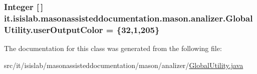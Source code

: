 \hypertarget{classit_1_1isislab_1_1masonassisteddocumentation_1_1mason_1_1analizer_1_1_global_utility_a0fcb324ae33eb93bd5b9177e342ecc82}{
\subsubsection[{user\-Output\-Color}]{\setlength{\rightskip}{0pt plus 5cm}Integer \mbox{[}$\,$\mbox{]} it.\-isislab.\-masonassisteddocumentation.\-mason.\-analizer.\-Global\-Utility.\-user\-Output\-Color = \{32,1,205\}\hspace{0.3cm}{\ttfamily [static]}}}\label{classit_1_1isislab_1_1masonassisteddocumentation_1_1mason_1_1analizer_1_1_global_utility_a0fcb324ae33eb93bd5b9177e342ecc82}


The documentation for this class was generated from the following file\-:\begin{DoxyCompactItemize}
\item 
src/it/isislab/masonassisteddocumentation/mason/analizer/\hyperlink{_global_utility_8java}{Global\-Utility.\-java}\end{DoxyCompactItemize}
